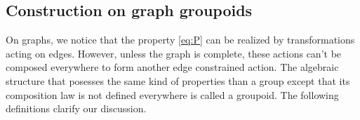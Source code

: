 




\subsection{Construction on graph groupoids}



On graphs, we notice that the property \eqref{eq:P} can be realized by transformations acting on edges. However, unless the graph is complete, these actions can't be composed everywhere to form another edge constrained action. The algebraic structure that posesses the same kind of properties than a group except that its composition law is not defined everywhere is called a groupoid. The following definitions clarify our discussion.

